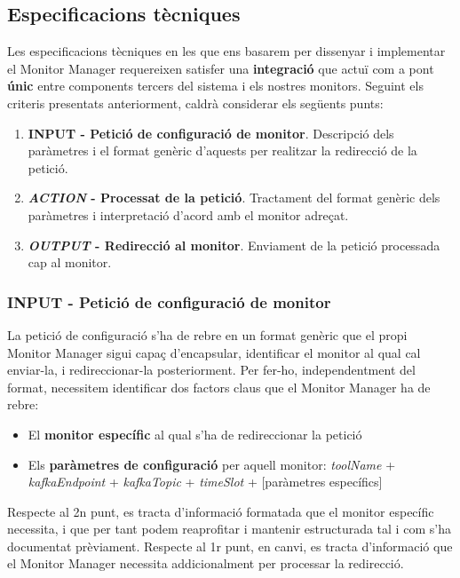 \subsection{Especificacions tècniques}

Les especificacions tècniques en les que ens basarem per dissenyar i implementar el Monitor Manager requereixen satisfer una \textbf{integració} que actuï com a pont \textbf{únic} entre components tercers del sistema i els nostres monitors. Seguint els criteris presentats anteriorment, caldrà considerar els següents punts:

\begin{enumerate}
\item \textbf{INPUT - Petició de configuració de monitor}. Descripció dels paràmetres i el format genèric d'aquests per realitzar la redirecció de la petició.
\item \textbf{\textit{ACTION} - Processat de la petició}. Tractament del format genèric dels paràmetres i interpretació d'acord amb el monitor adreçat.
\item \textbf{\textit{OUTPUT} - Redirecció al monitor}. Enviament de la petició processada cap al monitor.
\end{enumerate}

\subsubsection{INPUT - Petició de configuració de monitor}

La petició de configuració s'ha de rebre en un format genèric que el propi Monitor Manager sigui capaç d'encapsular, identificar el monitor al qual cal enviar-la, i redireccionar-la posteriorment. Per fer-ho, independentment del format, necessitem identificar dos factors claus que el Monitor Manager ha de rebre:

\begin{itemize}
\item El \textbf{monitor específic} al qual s'ha de redireccionar la petició
\item Els \textbf{paràmetres de configuració} per aquell monitor: \textit{toolName} + \textit{kafkaEndpoint} + \textit{kafkaTopic} + \textit{timeSlot} + [paràmetres específics]
\end{itemize} 

Respecte al 2n punt, es tracta d'informació formatada que el monitor específic necessita, i que per tant podem reaprofitar i mantenir estructurada tal i com s'ha documentat prèviament. Respecte al 1r punt, en canvi, es tracta d'informació que el Monitor Manager necessita addicionalment per processar la redirecció.\\

